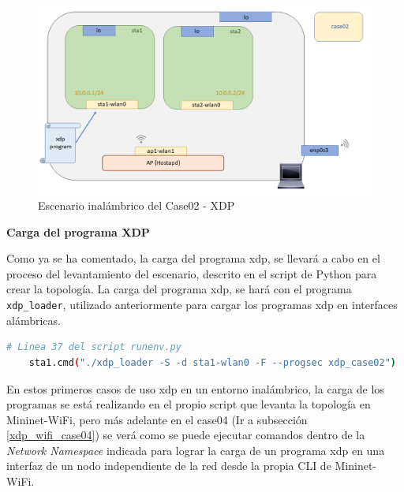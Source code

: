 \begin{figure}[ht]
    \centering
    \includegraphics[width=16cm]{archivos/img/dev/xdp-wifi/case02/scenario.png}
    \caption{Escenario inalámbrico del Case02 - XDP}
    \label{fig:case02_xdp_wifi_scenario}
\end{figure}


\vspace{0.5cm}
\textbf{Carga del programa XDP}\\
\par
Como ya se ha comentado, la carga del programa \gls{xdp}, se llevará a cabo en el proceso del levantamiento del escenario, descrito en el script de Python para crear la topología. La carga del programa \gls{xdp}, se hará con el programa \texttt{xdp\_loader}, utilizado anteriormente para cargar los programas \gls{xdp} en interfaces alámbricas. \\
\par

\begin{lstlisting}[language= bash, style=Consola, caption={Carga del programa XDP - Case02},label=code:case02_xdp_wifi_load]
    # Linea 37 del script runenv.py
    sta1.cmd("./xdp_loader -S -d sta1-wlan0 -F --progsec xdp_case02")
\end{lstlisting}
\vspace{0.5cm}
En estos primeros casos de uso \gls{xdp} en un entorno inalámbrico, la carga de los programas se está realizando en el propio script que levanta la topología en Mininet-WiFi, pero más adelante en el case04 (Ir a subsección \ref{xdp_wifi_case04}) se verá como se puede ejecutar comandos dentro de la \textit{Network Namespace} indicada para lograr la carga de un programa \gls{xdp} en una interfaz de un nodo independiente de la red desde la propia CLI de Mininet-WiFi.\\
\par




